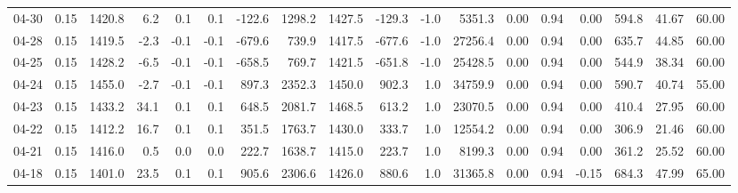 \begin{threeparttable}
{\begin{tabular}{lrrrrrrrrrrrrrrrrr}
  04-30 &     0.15 & 1420.8 &               6.2 &               0.1 &                0.1 &             -122.6 &  1298.2 & 1427.5 &     -129.3 &                     -1.0 &              5351.3 &       0.00 &      0.94 &           0.00 &            594.8 &           41.67 &                  60.00 \\
  04-28 &     0.15 & 1419.5 &              -2.3 &              -0.1 &               -0.1 &             -679.6 &   739.9 & 1417.5 &     -677.6 &                     -1.0 &             27256.4 &       0.00 &      0.94 &           0.00 &            635.7 &           44.85 &                  60.00 \\
  04-25 &     0.15 & 1428.2 &              -6.5 &              -0.1 &               -0.1 &             -658.5 &   769.7 & 1421.5 &     -651.8 &                     -1.0 &             25428.5 &       0.00 &      0.94 &           0.00 &            544.9 &           38.34 &                  60.00 \\
  04-24 &     0.15 & 1455.0 &              -2.7 &              -0.1 &               -0.1 &              897.3 &  2352.3 & 1450.0 &      902.3 &                      1.0 &             34759.9 &       0.00 &      0.94 &           0.00 &            590.7 &           40.74 &                  55.00 \\
  04-23 &     0.15 & 1433.2 &              34.1 &               0.1 &                0.1 &              648.5 &  2081.7 & 1468.5 &      613.2 &                      1.0 &             23070.5 &       0.00 &      0.94 &           0.00 &            410.4 &           27.95 &                  60.00 \\
  04-22 &     0.15 & 1412.2 &              16.7 &               0.1 &                0.1 &              351.5 &  1763.7 & 1430.0 &      333.7 &                      1.0 &             12554.2 &       0.00 &      0.94 &           0.00 &            306.9 &           21.46 &                  60.00 \\
  04-21 &     0.15 & 1416.0 &               0.5 &               0.0 &                0.0 &              222.7 &  1638.7 & 1415.0 &      223.7 &                      1.0 &              8199.3 &       0.00 &      0.94 &           0.00 &            361.2 &           25.52 &                  60.00 \\
  04-18 &     0.15 & 1401.0 &              23.5 &               0.1 &                0.1 &              905.6 &  2306.6 & 1426.0 &      880.6 &                      1.0 &             31365.8 &       0.00 &      0.94 &          -0.15 &            684.3 &           47.99 &                  65.00 \\

\end{tabular}}
\end{threeparttable}
